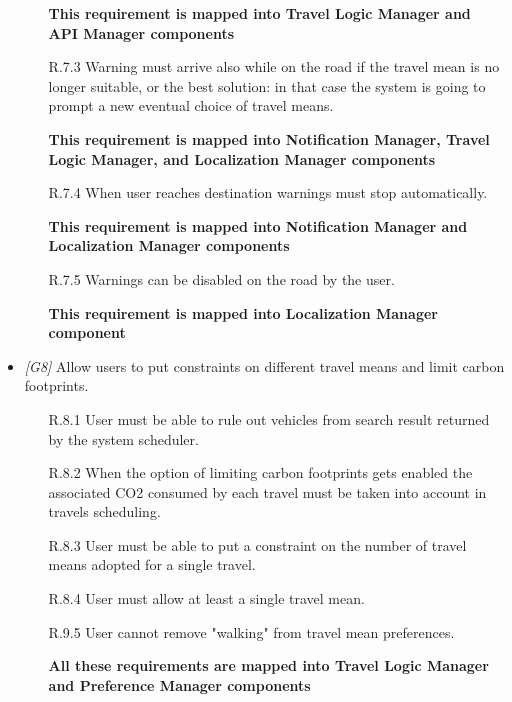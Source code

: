 \begin{itemize}
\begin{itemize}
			\textbf{This requirement is mapped into Travel Logic Manager and API Manager components} 

			\item [R.7.3] Warning must arrive also while on the road if the travel mean is no longer suitable, or the best solution: in that case the system is going to prompt a new eventual choice of travel means.
			
			\textbf{This requirement is mapped into Notification Manager, Travel Logic Manager, and Localization Manager components}

			\item [R.7.4] When user reaches destination warnings must stop automatically.
			
			\textbf{This requirement is mapped into Notification Manager and Localization Manager components}

			\item [R.7.5] Warnings can be disabled on the road by the user.
			
			\textbf{This requirement is mapped into Localization Manager component}
			

		\end{itemize}





	\item \textit{[G8]} Allow users to put constraints on different travel means and limit carbon footprints.

		\begin{itemize}

			\item[R.8.1] User must be able to rule out vehicles from search result returned by the system scheduler.

			\item[R.8.2] When the option of limiting carbon footprints gets enabled the associated CO2 consumed by each travel must be taken into account in travels scheduling.

			\item[R.8.3] User must be able to put a constraint on the number of travel means adopted for a single travel.

			\item[R.8.4] User must allow at least a single travel mean.

			\item[R.9.5] User cannot remove "walking" from travel mean preferences.
			
			\textbf{All these requirements are mapped into Travel Logic Manager and Preference Manager components}


\end{itemize}
\end{itemize}
